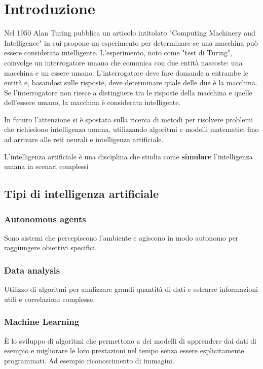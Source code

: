 \documentclass[a4paper]{article}
\begin{document}


\tableofcontents
\pagebreak

\section{Introduzione}
Nel 1950 Alan Turing pubblica un articolo intitolato "Computing Machinery and Intelligence"
in cui propone un esperimento per determinare se una macchina può essere considerata
intelligente. L'esperimento, noto come "test di Turing", coinvolge un interrogatore umano
che comunica con due entità nascoste: una macchina e un essere umano. L'interrogatore deve
fare domande a entrambe le entità e, basandosi sulle risposte, deve determinare quale delle
due è la macchina. Se l'interrogatore non riesce a distinguere tra le risposte
della macchina e quelle dell'essere umano, la macchina è considerata intelligente.

\vspace{1em}
\noindent
In futuro l'attenzione si è spostata sulla ricerca di metodi per risolvere problemi che richiedono intelligenza
umana, utilizzando algoritmi e modelli matematici fino ad arrivare alle reti neurali e intelligenza artificiale.

\begin{definition}
  L'intelligenza artificiale è una disciplina che studia come \textbf{simulare} l'intelligenza umana in
  scenari complessi
\end{definition}

\subsection{Tipi di intelligenza artificiale}
\subsubsection{Autonomous agents}
Sono sistemi che percepiscono l'ambiente e agiscono in modo autonomo per raggiungere obiettivi specifici.

\subsubsection{Data analysis}
Utilizzo di algoritmi per analizzare grandi quantità di dati e estrarre informazioni utili e correlazioni
complesse.

\subsubsection{Machine Learning}
È lo sviluppo di algoritmi che permettono a dei modelli di apprendere dai dati
di esempio e migliorare le loro prestazioni nel tempo senza essere esplicitamente programmati.
Ad esempio riconoscimento di immagini.
\end{document}
